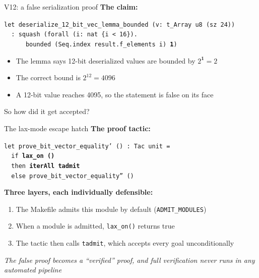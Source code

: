 \ifdefined\PRESENTATION\else\PassOptionsToClass{handout}{beamer}\fi\documentclass[aspectratio=169, lualatex]{beamer}
\begin{document}
\begin{frame}{V12: a false serialization proof}
	\textbf{The claim:}
	\begin{flushleft}
		\texttt{let deserialize\_12\_bit\_vec\_lemma\_bounded (v: t\_Array u8 (sz 24))}\\
		\texttt{~~: squash (forall (i: nat \{i < 16\}).}\\
		\texttt{~~~~~~bounded (Seq.index result.f\_elements i) \textbf{1})}
	\end{flushleft}
	\vspace{0.5em}
	\begin{itemize}
		\item The lemma says 12-bit deserialized values are bounded by $2^{\textbf{1}} = 2$
		\item The correct bound is $2^{12} = 4096$
		\item A 12-bit value reaches 4095, so the statement is false on its face
	\end{itemize}
	\vspace{0.5em}
	\begin{center}
		\Large
		So how did it get accepted?
	\end{center}
\end{frame}

\begin{frame}{The lax-mode escape hatch}
	\textbf{The proof tactic:}
	\begin{flushleft}
		\texttt{let prove\_bit\_vector\_equality' () : Tac unit =}\\
		\texttt{~~if \textbf{lax\_on ()}}\\
		\texttt{~~then \textbf{iterAll tadmit}}\\
		\texttt{~~else prove\_bit\_vector\_equality'' ()}
	\end{flushleft}
	\vspace{0.5em}
	\textbf{Three layers, each individually defensible:}
	\begin{enumerate}
		\item The Makefile admits this module by default (\texttt{ADMIT\_MODULES})
		\item When a module is admitted, \texttt{lax\_on()} returns true
		\item The tactic then calls \texttt{tadmit}, which accepts every goal unconditionally
	\end{enumerate}
	\vspace{0.5em}
	\begin{center}
		\textit{The false proof becomes a ``verified'' proof, and full verification never runs in any automated pipeline}
	\end{center}
\end{frame}
\end{document}
